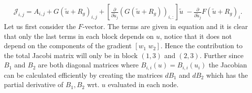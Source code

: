 \begin{align}
	\mathcal{J}_{i,j} = A_{i,j} + G(\tilde{u}+R_g)_{i,j} +  [\frac{\partial}{\partial \tilde{u}_j} (G(\tilde{u}+R_g))_{i,:}] \tilde{u} \; - \frac{\partial}{\partial \tilde{u}_j}F(\tilde{u}+R_g)_i.
\end{align}
%
Let us first consider the $F$-vector. The terms are given in equation and it is clear that only the last terms in each block depends on $u$, notice that it does not depend on the components of the gradient $[ w_1 \; w_2]$. Hence the contribution to the total Jacobi matrix will only be in block $(1,3)$ and $(2,3)$. Further since $B_1$ and $B_2$ are both diagonal matrices where $B_{i,i}(u) = B_{i,i}(u_i)$ the Jacobian can be calculated efficiently by creating the matrices $dB_1$ and $dB_2$ which has the partial derivative of $B_1,B_2$ wrt. $u$ evaluated in each node.   





